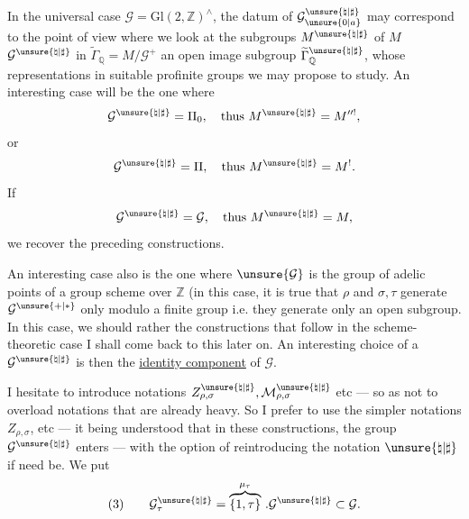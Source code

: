 In the universal case $\mathcal{G}=\mathrm{Gl}(2,\mathbb{Z})^{\wedge}$,
the datum of $\mathcal{G}_{\unsure{0|a}}^{\unsure{\natural|\sharp}}$
may correspond to the point of view where we look at the subgroups
$M^{\unsure{\natural|\sharp}}$ of $M$
$\mathcal{G}^{\unsure{\natural|\sharp}}$
in $\widetilde{\Gamma}_{\mathbb{Q}}=M/\mathcal{G}^{+}$
an open image subgroup
$\widetilde{\Gamma}_{\mathbb{Q}}^{\unsure{\natural|\sharp}}$,
whose representations in suitable profinite groups we may propose to study.
An interesting case will be the one where
\[
\mathcal{G}^{\unsure{\natural|\sharp}}=\Pi_{0},\quad
\text{thus }M^{\unsure{\natural|\sharp}}=M^{\prime\prime!},
\]
or
\[
\mathcal{G}^{\unsure{\natural|\sharp}}=\Pi,\quad
\text{thus }M^{\unsure{\natural|\sharp}}=M^{!}.
\]
If
\[
\mathcal{G}^{\unsure{\natural|\sharp}}=\mathcal{G},\quad
\text{thus }M^{\unsure{\natural|\sharp}}=M,
\]
we recover the preceding constructions.



An interesting case also is the one where $\unsure{\mathcal{G}}$ is the group
of adelic  points of a group scheme over $\mathbb{Z}$
(in this case, it is true that $\rho$ and $\sigma,\tau$ generate
 $\mathcal{G}^{\unsure{+|*}}$ only modulo a finite group
i.e. they generate  only an open subgroup.
In this case, we should rather \uline{} the constructions
that follow in the scheme-theoretic case
I shall come back to this later on. An interesting choice of a
$\mathcal{G}^{\unsure{\natural|\sharp}}$ is then the
\uline{identity component} of $\mathcal{G}$.

I hesitate to introduce notations
$Z_{\rho,\sigma}^{\unsure{\natural|\sharp}},\mathcal{M}_{\rho,\sigma}^{\unsure{\natural|\sharp}}$
etc --- so as not to overload notations that are already heavy. So I prefer to
use the simpler notations $Z_{\rho,\sigma}$, etc --- it being understood
that in these constructions, the group $\mathcal{G}^{\unsure{\natural|\sharp}}$
enters --- with the option of reintroducing the notation $\unsure{\natural|\sharp}$
if need be.
We put
\[
(3)\qquad
\mathcal{G}_{\tau}^{\unsure{\natural|\sharp}}
=\overbrace{\{1,\tau\}}^{\mu_{\tau}}\,.
\mathcal{G}^{\unsure{\natural|\sharp}}\subset\mathcal{G}.
\]


